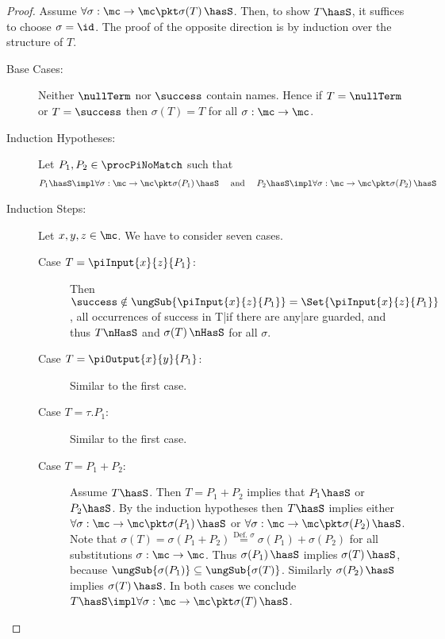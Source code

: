 \documentclass[]{article}
\begin{document}
\begin{proof}
	Assume $ \forall \sigma : \mc \to \mc \pkt \sigma\!\left( T \right) \hasS $. Then, to show $ T \hasS $, it suffices to choose $ \sigma = \id $.
	The proof of the opposite direction is by induction over the structure of $ T $.
	\begin{description}
		\item[Base Cases:] Neither $ \nullTerm $ nor $ \success $ contain names. Hence if $ T = \nullTerm $ or $ T = \success $ then $ \sigma\!\left( T \right) = T $ for all $ \sigma : \mc \to \mc $.
		\item[Induction Hypotheses:] Let $ P_1, P_2 \in \procPiNoMatch $ such that
			\begin{align*}
				P_1 \hasS \impl \forall \sigma : \mc \to \mc \pkt \sigma\!\left( P_1 \right) \hasS \quad \text{ and } \quad P_2 \hasS \impl \forall \sigma : \mc \to \mc \pkt \sigma\!\left( P_2 \right) \hasS
			\end{align*}
		\item[Induction Steps:] Let $ x, y, z \in \mc $. We have to consider seven cases.
			\begin{description}
				\item[Case $ T = \piInput{x}{z}{P_1} $:] Then $ \success \notin \ungSub{\piInput{x}{z}{P_1}} = \Set{ \piInput{x}{z}{P_1}} $, \ie all occurrences of success in T|if there are any|are guarded, and thus $ T \nHasS $ and $ \sigma\!\left( T \right) \nHasS $ for all $ \sigma $.
				\item[Case $ T = \piOutput{x}{y}{P_1} $:] Similar to the first case.
				\item[Case $ T = \tau.P_1 $:] Similar to the first case.
				\item[Case $ T = P_1 + P_2 $:] Assume $ T \hasS $. Then $ T = P_1 + P_2 $ implies that $ P_1 \hasS $ or $ P_2 \hasS $. By the induction hypotheses then $ T \hasS $ implies either $ \forall \sigma : \mc \to \mc \pkt \sigma\!\left( P_1 \right) \hasS $ or $ \forall \sigma : \mc \to \mc \pkt \sigma\!\left( P_2 \right) \hasS $. Note that $ \sigma\!\left( T \right) = \sigma\!\left( P_1 + P_2 \right) \stackrel{\text{Def. } \sigma}{=} \sigma\!\left( P_1 \right) + \sigma\!\left( P_2 \right) $ for all substitutions $ \sigma : \mc \to \mc $. Thus $ \sigma\!\left( P_1 \right) \hasS $ implies $ \sigma\!\left( T \right) \hasS $, because $ \ungSub{\sigma\!\left( P_1 \right)} \subseteq \ungSub{\sigma\!\left( T \right)} $. Similarly $ \sigma\!\left( P_2 \right) \hasS $ implies $ \sigma\!\left( T \right) \hasS $. In both cases we conclude $ T \hasS \impl \forall \sigma : \mc \to \mc \pkt \sigma\!\left( T \right) \hasS $.

\end{description}
\end{description}
\end{proof}
\end{document}
